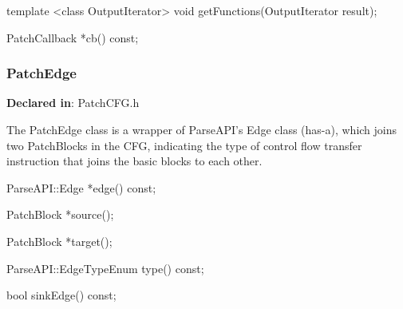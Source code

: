 
\begin{apient}
template <class OutputIterator>
void getFunctions(OutputIterator result);
\end{apient}


\begin{apient}
PatchCallback *cb() const;
\end{apient}


\subsubsection{PatchEdge}
\label{sec-3.2.11}

\textbf{Declared in}: PatchCFG.h

The PatchEdge class is a wrapper of ParseAPI's Edge class (has-a), which joins
two PatchBlocks in the CFG, indicating the type of control flow transfer
instruction that joins the basic blocks to each other.


\begin{apient}
ParseAPI::Edge *edge() const;
\end{apient}


\begin{apient}
PatchBlock *source();
\end{apient}


\begin{apient}
PatchBlock *target();
\end{apient}


\begin{apient}
ParseAPI::EdgeTypeEnum type() const;
\end{apient}


\begin{apient}
bool sinkEdge() const;
\end{apient}


